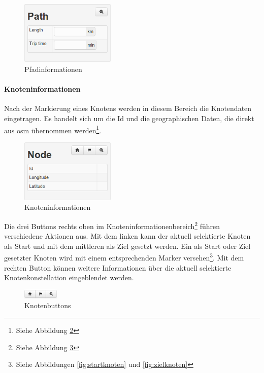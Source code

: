 \begin{figure}[htbp]
  \centering
  \includegraphics[width=0.4\textwidth]{Bilder/Pfadinformationen.png}
  \caption{Pfadinformationen}
  \label{fig:pfadinformationen}
\end{figure}

\paragraph{Knoteninformationen}
\label{sec:knoteninformationen}

Nach der Markierung eines Knotens werden in diesem Bereich die Knotendaten eingetragen.
Es handelt sich um die Id und die geographischen Daten, die direkt aus \ac{osm} übernommen werden\footnote{Siehe Abbildung \ref{fig:knoteninformationen}}.

\begin{figure}[htbp]
  \centering
  \includegraphics[width=0.4\textwidth]{Bilder/Knoteninformationen.png}
  \caption{Knoteninformationen}
  \label{fig:knoteninformationen}
\end{figure}

Die drei Buttons rechts oben im Knoteninformationenbereich\footnote{Siehe Abbildung \ref{fig:knotenbuttons}} führen verschiedene Aktionen aus.
Mit dem linken kann der aktuell selektierte Knoten als Start und mit dem mittleren als Ziel gesetzt werden.
Ein als Start oder Ziel gesetzter Knoten wird mit einem entsprechenden Marker versehen\footnote{Siehe Abbildungen \ref{fig:startknoten} und \ref{fig:zielknoten}}.
Mit dem rechten Button können weitere Informationen über die aktuell selektierte Knotenkonstellation eingeblendet werden.

\begin{figure}[htbp]
  \centering
  \includegraphics[width=0.15\textwidth]{Bilder/Knotenbuttons.png}
  \caption{Knotenbuttons}
  \label{fig:knotenbuttons}
\end{figure}

